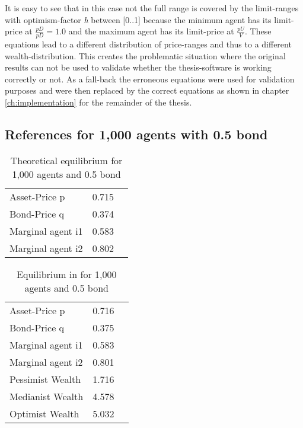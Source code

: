 \documentclass[Bachelorarbeit.tex]{subfiles}
\begin{document}
It is easy to see that in this case not the full range is covered by the limit-ranges with optimism-factor \textit{h} between [0..1] because the minimum agent has its limit-price at $\frac{pD}{pD} = 1.0$ and the maximum agent has its limit-price at $\frac{pU}{V}$.  These equations lead to a different distribution of price-ranges and thus to a different wealth-distribution. This creates the problematic situation where the original results can not be used to validate whether the thesis-software is working correctly or not. As a fall-back the erroneous equations were used for validation purposes and were then replaced by the correct equations as shown in chapter \ref{ch:implementation} for the remainder of the thesis. 

\subsection{References for 1,000 agents with 0.5 bond}

\begin{table}[H]
	\centering
	\caption{Theoretical equilibrium for 1,000 agents and 0.5 bond}
	\begin{tabular} { l c r }
		\hline
		Asset-Price p & 0.715 \\
		Bond-Price q & 0.374 \\
		Marginal agent i1 & 0.583 \\
		Marginal agent i2 & 0.802 \\
		\hline
	\end{tabular}
	\label{tab:equilibrium_THEORY_1000}
\end{table}

\begin{table}[H]
	\centering
	\caption{Equilibrium in \cite{Breuer2015} for 1,000 agents and 0.5 bond}
	\begin{tabular} { l c r }
		\hline
		Asset-Price p & 0.716 \\
		Bond-Price q & 0.375 \\
		Marginal agent i1 & 0.583 \\
		Marginal agent i2 & 0.801 \\
		\hline
		Pessimist Wealth & 1.716 \\
		Medianist Wealth & 4.578 \\
		Optimist Wealth & 5.032 \\
		\hline
	\end{tabular}
	\label{tab:equilibrium_BREUER_1000}
\end{table}
\end{document}

